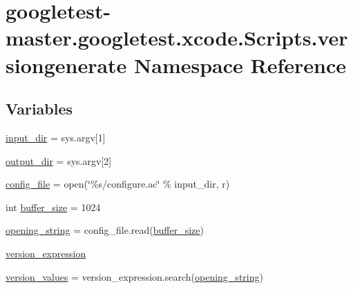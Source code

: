 \hypertarget{namespacegoogletest-master_1_1googletest_1_1xcode_1_1_scripts_1_1versiongenerate}{}\section{googletest-\/master.googletest.\+xcode.\+Scripts.\+versiongenerate Namespace Reference}
\label{namespacegoogletest-master_1_1googletest_1_1xcode_1_1_scripts_1_1versiongenerate}
\subsection*{Variables}
\begin{DoxyCompactItemize}
\item 
\mbox{\hyperlink{namespacegoogletest-master_1_1googletest_1_1xcode_1_1_scripts_1_1versiongenerate_aad54ebc7b97c4470cd2909b8b1e64f04}{input\+\_\+dir}} = sys.\+argv\mbox{[}1\mbox{]}
\item 
\mbox{\hyperlink{namespacegoogletest-master_1_1googletest_1_1xcode_1_1_scripts_1_1versiongenerate_ae5cb033e11d85bd6958fb632ea0a90e1}{output\+\_\+dir}} = sys.\+argv\mbox{[}2\mbox{]}
\item 
\mbox{\hyperlink{namespacegoogletest-master_1_1googletest_1_1xcode_1_1_scripts_1_1versiongenerate_a2f37f17d0275f802f955fd2f49e13f9d}{config\+\_\+file}} = open(\char`\"{}\%s/configure.\+ac\char`\"{} \% input\+\_\+dir, \textquotesingle{}r\textquotesingle{})
\item 
int \mbox{\hyperlink{namespacegoogletest-master_1_1googletest_1_1xcode_1_1_scripts_1_1versiongenerate_a84162d104e9a0426bb747ca62fac346f}{buffer\+\_\+size}} = 1024
\item 
\mbox{\hyperlink{namespacegoogletest-master_1_1googletest_1_1xcode_1_1_scripts_1_1versiongenerate_a2f1e107ea3b6d23c6373ad9b4704e8be}{opening\+\_\+string}} = config\+\_\+file.\+read(\mbox{\hyperlink{namespacegoogletest-master_1_1googletest_1_1xcode_1_1_scripts_1_1versiongenerate_a84162d104e9a0426bb747ca62fac346f}{buffer\+\_\+size}})
\item 
\mbox{\hyperlink{namespacegoogletest-master_1_1googletest_1_1xcode_1_1_scripts_1_1versiongenerate_a8634acf78b3d63d86af57f0f26f54fbc}{version\+\_\+expression}}
\item 
\mbox{\hyperlink{namespacegoogletest-master_1_1googletest_1_1xcode_1_1_scripts_1_1versiongenerate_af52deb41272385600c5b464ee5d8d0ed}{version\+\_\+values}} = version\+\_\+expression.\+search(\mbox{\hyperlink{namespacegoogletest-master_1_1googletest_1_1xcode_1_1_scripts_1_1versiongenerate_a2f1e107ea3b6d23c6373ad9b4704e8be}{opening\+\_\+string}})

\end{DoxyCompactItemize}
